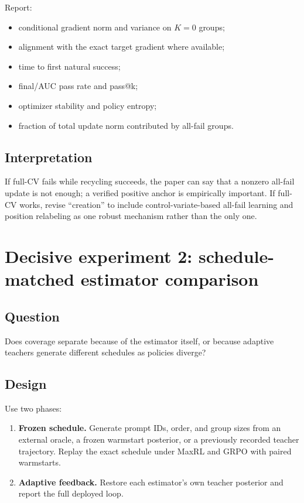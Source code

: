 \documentclass[11pt]{article}
\theoremstyle{definition}
\theoremstyle{remark}
\begin{document}
Report:

\begin{itemize}[leftmargin=2em]
\item conditional gradient norm and variance on $K=0$ groups;
\item alignment with the exact target gradient where available;
\item time to first natural success;
\item final/AUC pass rate and pass@k;
\item optimizer stability and policy entropy;
\item fraction of total update norm contributed by all-fail groups.
\end{itemize}

\subsection{Interpretation}

If full-CV fails while recycling succeeds, the paper can say that a nonzero all-fail update is not enough; a verified positive anchor is empirically important. If full-CV works, revise ``creation'' to include control-variate-based all-fail learning and position relabeling as one robust mechanism rather than the only one.

\section{Decisive experiment 2: schedule-matched estimator comparison}

\subsection{Question}

Does coverage separate because of the estimator itself, or because adaptive teachers generate different schedules as policies diverge?

\subsection{Design}

Use two phases:

\begin{enumerate}[leftmargin=2em]
\item \textbf{Frozen schedule.} Generate prompt IDs, order, and group sizes from an external oracle, a frozen warmstart posterior, or a previously recorded teacher trajectory. Replay the exact schedule under MaxRL and GRPO with paired warmstarts.
\item \textbf{Adaptive feedback.} Restore each estimator's own teacher posterior and report the full deployed loop.
\end{enumerate}
\end{document}
